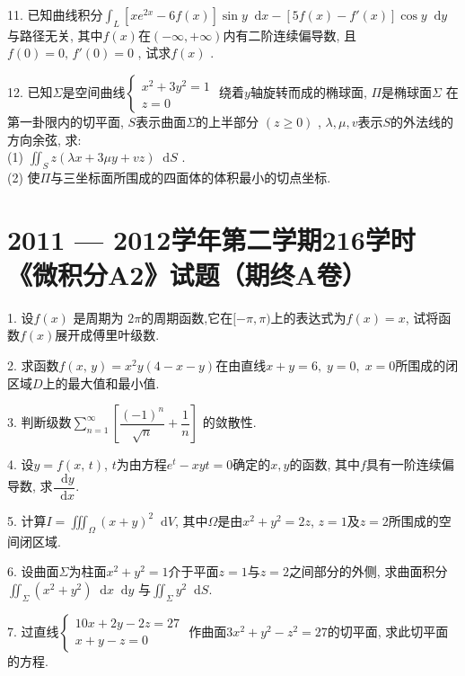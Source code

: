 \documentclass{article}
\newcommand*{\dif}{\mathop{}\!\mathrm{d}}
\begin{document}
11. 已知曲线积分$\displaystyle\int_L{[xe^{2x}-6f(x)]\sin y \dif x - [5f(x)-f'(x)]\cos y \dif y}$
与路径无关, 其中$f(x)$在$(-\infty, +\infty)$内有二阶连续偏导数, 
且$f(0)=0, \,f'(0)=0$ , 试求$f(x)$ . \par

12. 已知$\Sigma$是空间曲线$\begin{cases}x^2+3y^2=1\\z=0\end{cases}$
绕着$y$轴旋转而成的椭球面, $\Pi$是椭球面$\Sigma$
在第一卦限内的切平面, $S$表示曲面$\Sigma$的上半部分 $(z\geqslant0)$ , 
$\lambda , \mu, v$表示$S$的外法线的方向余弦, 求: \\
(1) $\displaystyle\iint_S{z(\lambda x + 3\mu y + v z)\dif S}$ .\\
(2) 使$\Pi$与三坐标面所围成的四面体的体积最小的切点坐标.

\newpage

\section*{2011 --- 2012学年第二学期216学时《微积分A2》试题（期终A卷）}

1. 设$f(x)$ 是周期为 $2\pi$的周期函数,它在$[-\pi, \pi)$上的表达式为$f(x) = x$, 
试将函数$f(x)$展开成傅里叶级数. \par

2. 求函数$f(x,\,y)=x^2y(4-x-y)$在由直线$x+y=6,\;y=0,\;x=0$所围成的闭区域$D$上的最大值和最小值. \par

3. 判断级数$\displaystyle\sum\limits_{n=1}^\infty{\left[\dfrac{(-1)^n}{\sqrt{n}} + \dfrac{1}{n}\right]}$
的敛散性.\par

4. 设$y=f(x,\,t)$, $t$为由方程$e^t-x y t = 0$确定的$x, y$的函数, 
其中$f$具有一阶连续偏导数, 求$\dfrac{\dif y}{\dif x}$.\par

5. 计算$I = \displaystyle\iiint_\Omega{(x+y)^2\dif V}$, 
其中$\Omega$是由$x^2+y^2=2z$, $z=1$及$z=2$所围成的空间闭区域. \par

6. 设曲面$\Sigma$为柱面$x^2+y^2=1$介于平面$z=1$与$z=2$之间部分的外侧, 
求曲面积分$\displaystyle\iint_\Sigma{(x^2+y^2)}\dif x \dif y$
与$\displaystyle\iint_\Sigma{y^2 \dif S}$. \par

7. 过直线$\begin{cases}10x+2y-2z=27\\ x+y-z=0\end{cases}$
作曲面$3x^2+y^2-z^2=27$的切平面, 求此切平面的方程. \par
\end{document}
